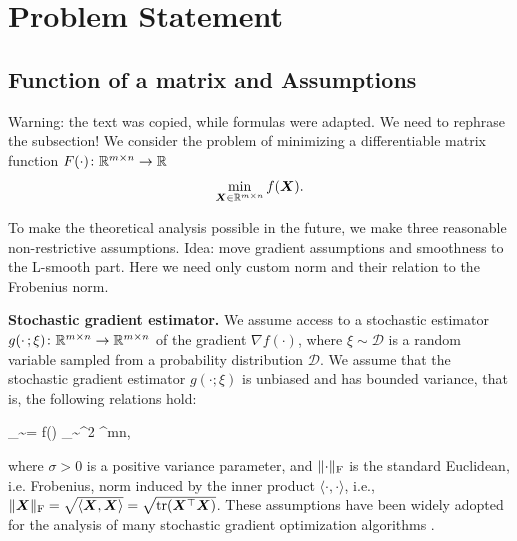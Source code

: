 \documentclass{article} %
\newcommand{\Rmn}{\R^{m\times n}}
\newcommand{\cD}{\mathcal{D}}
\newcommand{\Ed}[2]{\mathbb{E}_{#1}\left[#2\right]}
\DeclarePairedDelimiter{\normf}{\|}{\|_\mathrm{F}}
\DeclarePairedDelimiter{\sqnf}{\|}{\|_{\mathrm{F}}^2}
\def\<#1,#2>{\langle #1,#2\rangle}
\newcounter{aequation}
\DeclareMathOperator{\tr}{tr}
\begin{document}
\section{Problem Statement}
\subsection{Function of a matrix and Assumptions}
Warning: the text was copied, while formulas were adapted. We need to rephrase the subsection! 
  We consider the problem of minimizing a differentiable matrix function $F(\cdot)\colon \Rmn \to \R$
  \begin{equation}\label{eq:mat}
    \min_{\mX \in \Rmn} f(\mX).
  \end{equation}

To make the theoretical analysis possible in the future, we make three reasonable non-restrictive assumptions.
Idea: move gradient assumptions and smoothness to the L-smooth part. Here we need only custom norm and their relation to the Frobenius norm.

{\bf Stochastic gradient estimator.}
We assume access to a stochastic estimator $g(\cdot\,;\xi)\colon \Rmn \to \Rmn$ of the gradient $\nabla f(\cdot)$, where $\xi \sim \cD$ is a random variable sampled from a probability distribution $\cD$. We assume that the stochastic gradient estimator $g(\cdot;\xi)$ is unbiased and has bounded variance, that is, the following relations hold:
\begin{aequation}\label{eq:variance}
  \Ed{\xi \sim \cD}{g(\mX;\xi)} = \nabla f(\mX)
  \quad{}\quad
  \Ed{\xi \sim \cD}{\sqnf{g(\mX;\xi) - \nabla f(\mX)}} \leq \sigma^2
  \quad{}\;
  \mX \in \Rmn,
\end{aequation}
where $\sigma > 0$ is a positive variance parameter, and $\normf{\cdot}$ is the standard Euclidean, i.e. Frobenius, norm induced by the inner product $\<\cdot,\cdot>$, i.e., $\normf{\mX} = \sqrt{\<\mX,\mX>}=\sqrt{\tr(\mX^\top \mX)}$. These assumptions have been widely adopted for the analysis of many stochastic gradient optimization algorithms \citep{ghadimi2013stochastic,ghadimi2016accelerated,cutkosky2020momentum,sun2023momentum,horvath2023stochastic,gorbunov2020linearly}.
\end{document}
